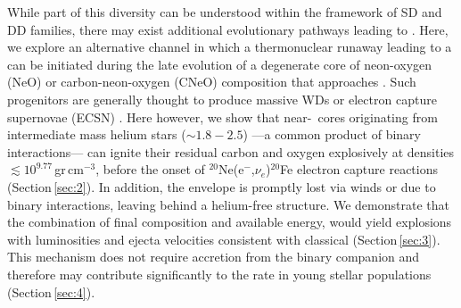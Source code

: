 \documentclass[../../main/thesis_msc.tex]{subfiles}
\begin{document}
While part of this diversity can be understood within the framework of SD and DD 
families, there may exist additional 
evolutionary pathways leading to \ias. 
Here, we explore an alternative channel in which a thermonuclear runaway leading to a \ia can be initiated during the late evolution of a degenerate core of neon-oxygen 
(NeO) or carbon-neon-oxygen (CNeO) composition that approaches  \mch. 
Such progenitors are generally thought to produce massive WDs or     
electron capture supernovae (ECSN)  
\citep[e.g.,][]{nomoto1991,gutierrez1996,Takahashi:2013ena}. %
Here however, we show that near-\mch\ \one cores originating from intermediate mass helium stars ($\sim 1.8-2.5$\msun) ---a common product of binary interactions--- can ignite their residual carbon and oxygen explosively at  
densities $\lesssim 10^{9.77}$\,gr\,cm$^{-3}$, 
before the onset of {\rm $^{20}$Ne(e$^-$,$\nu_e$)$^{20}$Fe} 
electron capture reactions (Section\,\ref{sec:2}). 
In addition, the envelope is promptly lost via winds or due to binary interactions, leaving behind a helium-free structure.  
We demonstrate that the combination of 
final composition and available energy, 
would yield explosions with luminosities and ejecta velocities 
consistent with classical \ias (Section\,\ref{sec:3}). 
 This mechanism  does not require accretion from the binary companion and 
 therefore may contribute significantly to the \ia  rate in young stellar populations (Section\,\ref{sec:4}). 
 
\end{document}
